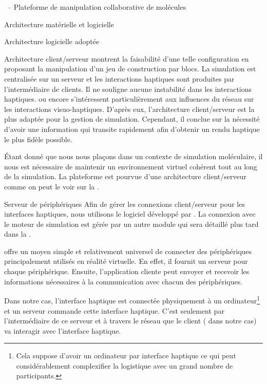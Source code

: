 \documentclass[myfrancais,ngerman,english,frenchb]{mythesis}
\begin{document}
\begin{mychapter}{\myShaddock\ -- Plateforme de manipulation collaborative de molécules}
\begin{mysection}{Architecture matérielle et logicielle}
\begin{mysubsection}{Architecture logicielle adoptée}
\begin{mysubsubsection}{Architecture client/serveur}
					 montrent la faisabilité d'une telle configuration en proposant la manipulation d'un jeu de construction par blocs.
					La simulation est centralisée sur un serveur et les interactions haptiques sont produites par l'intermédiaire de clients.
					Il ne souligne aucune instabilité dans les interactions haptiques.
					 ou encore  s'intéressent particulièrement aux influences du réseau sur les interactions visuo-haptiques.
					D'après eux, l'architecture client/serveur est la plus adaptée pour la gestion de simulation.
					Cependant, il conclue sur la nécessité d'avoir une information qui transite rapidement afin d'obtenir un rendu haptique le plus fidèle possible.

					Étant donné que nous nous plaçons dans un contexte de simulation moléculaire, il nous est nécessaire de maintenir un environnement virtuel cohérent tout au long de la simulation.
					La plateforme \myShaddock est pourvue d'une architecture client/serveur comme on peut le voir sur la .
				\end{mysubsubsection}
				\begin{mysubsubsection}{Serveur de périphériques}
					Afin de gérer les connexions client/serveur pour les interfaces haptiques, nous utilisons le logiciel  développé par .
					La connexion avec le moteur de simulation est gérée par un autre module qui sera détaillé plus tard dans la .

					 offre un moyen simple et relativement universel de connecter des périphériques principalement utilisés en réalité virtuelle.
					En effet, il fournit un serveur pour chaque périphérique.
					Ensuite, l'application cliente peut envoyer et recevoir les informations nécessaires à la communication avec chacun des périphériques.

					Dans notre cas, l'interface haptique est connectée physiquement à un ordinateur\footnote{Cela suppose d'avoir un ordinateur par interface haptique ce qui peut considérablement complexifier la logistique avec un grand nombre de participants.} et un serveur  commande cette interface haptique.
					C'est seulement par l'intermédiaire de ce serveur  et à travers le réseau que le client ( dans notre cas) va interagir avec l'interface haptique.


\end{mysubsubsection}
\end{mysubsection}
\end{mysection}
\end{mychapter}
\end{document}
